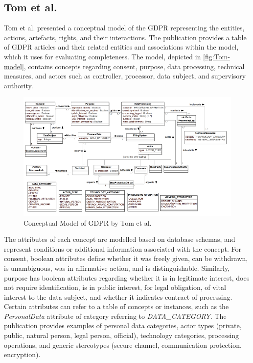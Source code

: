 \subsection*{Tom et al.}
Tom et al. \cite{tom_conceptual_2018} presented a conceptual model of the GDPR representing the entities, actions, artefacts, rights, and their interactions. The publication provides a table of GDPR articles and their related entities and associations within the model, which it uses for evaluating completeness.
The model, depicted in \autoref{fig:Tom-model}, contains concepts regarding consent, purpose, data processing, technical measures, and actors such as controller, processor, data subject, and supervisory authority.
\begin{figure}[htbp]
    \centering
    \includegraphics[width=\linewidth]{img/Tom_model.png}
    \caption{Conceptual Model of GDPR by Tom et al. \cite{tom_conceptual_2018}}
    \label{fig:Tom-model}
\end{figure}

The attributes of each concept are modelled based on database schemas, and represent conditions or additional information associated with the concept. For consent, boolean attributes define whether it was freely given, can be withdrawn, is unambiguous, was in affirmative action, and is distinguishable. Similarly, purpose has boolean attributes regarding whether it is in legitimate interest, does not require identification, is in public interest, for legal obligation, of vital interest to the data subject, and whether it indicates contract of processing. Certain attributes can refer to a table of concepts or instances, such as the \textit{PersonalData} attribute of category referring to \textit{DATA\_CATEGORY}. The publication provides examples of personal data categories, actor types (private, public, natural person, legal person, official), technology categories, processing operations, and generic stereotypes (secure channel, communication protection, encryption).

